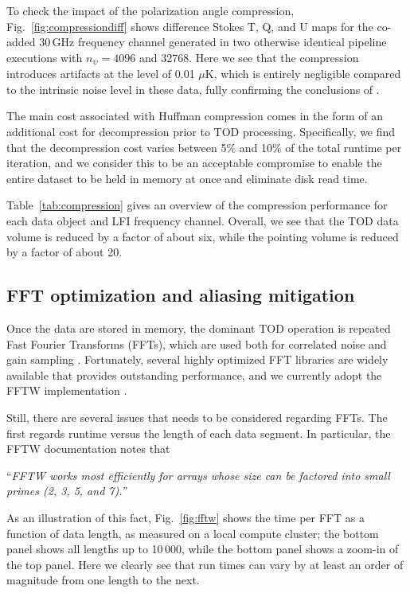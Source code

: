 \documentclass[twocolumn]{aa}
\begin{document}
To check the impact of the polarization angle compression,
Fig.~\ref{fig:compressiondiff} shows difference Stokes T, Q, and
U maps for the co-added 30\,GHz frequency channel generated in two
otherwise identical pipeline executions with $n_{\psi}=4096$ and
32768. Here we see that the compression introduces artifacts at the
level of 0.01 $\mu$K, which is entirely negligible compared to
the intrinsic noise level in these data, fully confirming the
conclusions of \citet{keihanen2012}.

The main cost associated with Huffman compression comes in the form of
an additional cost for decompression prior to TOD
processing. Specifically, we find that the decompression cost varies
between 5\% and 10\% of the total runtime per iteration, and we
consider this to be an acceptable compromise to enable the entire
dataset to be held in memory at once and eliminate disk read time.

Table~\ref{tab:compression} gives an overview of the compression
performance for each data object and LFI frequency channel. Overall,
we see that the TOD data volume is reduced by a factor of about six,
while the pointing volume is reduced by a factor of about 20. 

\subsection{FFT optimization and aliasing mitigation}

Once the data are stored in memory, the dominant TOD operation is
repeated Fast Fourier Transforms (FFTs), which are used both for
correlated noise and gain sampling \citep{BP06,BP07}. Fortunately,
several highly optimized FFT libraries are widely available that
provides outstanding performance, and we currently adopt the FFTW
implementation \citep{FFTW05}.

Still, there are several issues that needs to be considered regarding
FFTs. The first regards runtime versus the length of each data
segment. In particular, the FFTW documentation notes that
\begin{displayquote}
``\emph{FFTW works most efficiently for arrays whose size can be factored into small primes (2, 3, 5, and 7).''}
\end{displayquote}
As an illustration of this fact, Fig.~\ref{fig:fftw} shows the time
per FFT as a function of data length, as measured on a local compute
cluster; the bottom panel shows all lengths up to 10\,000, while the
bottom panel shows a zoom-in of the top panel. Here we clearly see
that run times can vary by at least an order of magnitude from one
length to the next.
\end{document}
